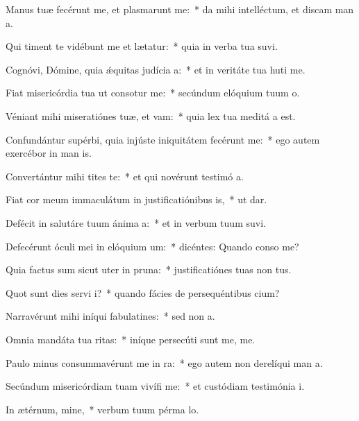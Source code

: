 \item Manus tuæ fecérunt me, et plasmarunt me:~* da mihi intelléctum, et discam man a.
\item Qui timent te vidébunt me et lætatur:~* quia in verba tua suvi.
\item Cognóvi, Dómine, quia ǽquitas judícia a:~* et in veritáte tua huti me.
\item Fiat misericórdia tua ut consotur me:~* secúndum elóquium tuum  o.
\item Véniant mihi miseratiónes tuæ, et vam:~* quia lex tua meditá a est.
\item Confundántur supérbi, quia injúste iniquitátem fecérunt  me:~* ego autem exercébor in man is.
\item Convertántur mihi tites te:~* et qui novérunt testimó a.
\item Fiat cor meum immaculátum in justificatiónibus is,~* ut  dar.
\item Defécit in salutáre tuum ánima a:~* et in verbum tuum suvi.
\item Defecérunt óculi mei in elóquium um:~* dicéntes: Quando conso me?
\item Quia factus sum sicut uter in pruna:~* justificatiónes tuas non  tus.
\item Quot sunt dies servi i?~* quando fácies de persequéntibus  cium?
\item Narravérunt mihi iníqui fabulatines:~* sed non   a.
\item Omnia mandáta tua ritas:~* iníque persecúti sunt me,  me.
\item Paulo minus consummavérunt me in ra:~* ego autem non derelíqui man a.
\item Secúndum misericórdiam tuam vivífi me:~* et custódiam testimónia  i.
\item In ætérnum, mine,~* verbum tuum pérma  lo.
